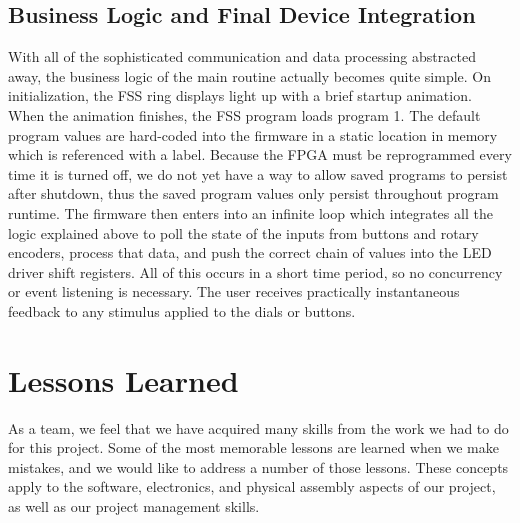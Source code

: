 \documentclass[conference]{IEEEtran}
\begin{document}
\subsection{Business Logic and Final Device Integration}
With all of the sophisticated communication and data processing abstracted away, the business logic of the main routine actually becomes quite simple. On initialization, the FSS ring displays light up with a brief startup animation. When the animation finishes, the FSS program loads program 1. The default program values are hard-coded into the firmware in a static location in memory which is referenced with a label. Because the FPGA must be reprogrammed every time it is turned off, we do not yet have a way to allow saved programs to persist after shutdown, thus the saved program values only persist throughout program runtime. The firmware then enters into an infinite loop which integrates all the logic explained above to poll the state of the inputs from buttons and rotary encoders, process that data, and push the correct chain of values into the LED driver shift registers. All of this occurs in a short time period, so no concurrency or event listening is necessary. The user receives practically instantaneous feedback to any stimulus applied to the dials or buttons.

\section{Lessons Learned}
As a team, we feel that we have acquired many skills from the work we had to do for this project. Some of the most memorable lessons are learned when we make mistakes, and we would like to address a number of those lessons. These concepts apply to the software, electronics, and physical assembly aspects of our project, as well as our project management skills.
\end{document}
